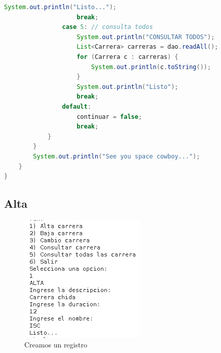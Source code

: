 \documentclass[a4paper,12pt]{article}
\begin{document}
\begin{lstlisting}[language=Java, style=customJava, 
caption={Instituto.java},captionpos=b,basicstyle=\fontfamily{cmss}\small]
                    System.out.println("Listo...");
                    break;
                case 5: // consulta todos
                    System.out.println("CONSULTAR TODOS");
                    List<Carrera> carreras = dao.readAll();
                    for (Carrera c : carreras) {
                        System.out.println(c.toString());
                    }
                    System.out.println("Listo");
                    break;
                default:
                    continuar = false;
                    break;
            }
        }
        System.out.println("See you space cowboy...");
    }
}
\end{lstlisting}

\subsection{Alta}
\begin{figure}[H]
\begin{center}
 \includegraphics[width=\textwidth]{alta.png}
 \caption{Creamos un registro}
 \label{fig:alta}
\end{center}
\end{figure}
\end{document}
